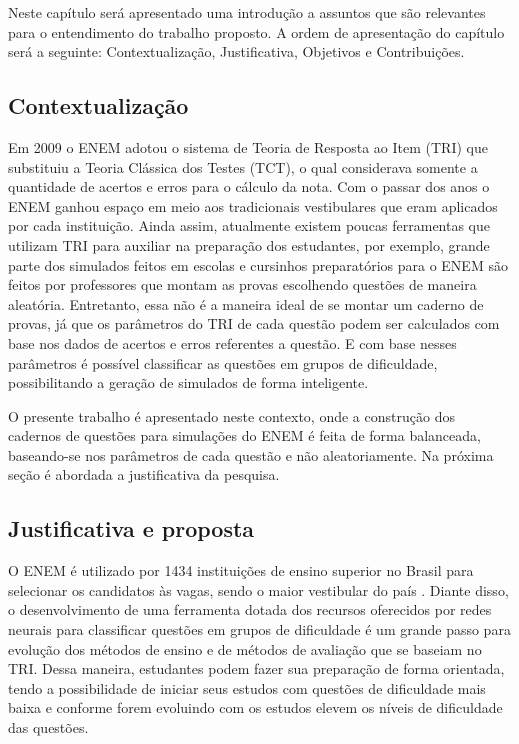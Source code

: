 \documentclass[article,	12pt,	oneside, a4paper,	english, brazil, sumario=tradicional, section=TITLE]{abntex2}
\begin{document}
Neste capítulo será apresentado uma introdução a assuntos que são relevantes para o entendimento do trabalho proposto. A ordem de apresentação do capítulo será a seguinte: Contextualização, Justificativa, Objetivos e Contribuições.

\subsection{Contextualização}

Em 2009 o ENEM adotou o sistema de Teoria de Resposta ao Item (TRI) que substituiu a Teoria Clássica dos Testes (TCT), o qual considerava somente a quantidade de acertos e erros para o cálculo da nota. Com o passar dos anos o ENEM ganhou espaço em meio aos tradicionais vestibulares que eram aplicados por cada instituição. Ainda assim, atualmente existem poucas ferramentas que utilizam TRI para auxiliar na preparação dos estudantes, por exemplo, grande parte dos simulados feitos em escolas e cursinhos preparatórios para o ENEM são feitos por professores que montam as provas escolhendo questões de maneira aleatória. Entretanto, essa não é a maneira ideal de se montar um caderno de provas, já que os parâmetros do TRI de cada questão podem ser calculados com base nos dados de acertos e erros referentes a questão. E com base nesses parâmetros é possível classificar as questões em grupos de dificuldade, possibilitando a geração de simulados de forma inteligente.

O presente trabalho é apresentado neste contexto, onde a construção dos cadernos de questões para simulações do ENEM é feita de forma balanceada, baseando-se nos parâmetros de cada questão e não aleatoriamente. Na próxima seção é abordada a justificativa da pesquisa.

\subsection{Justificativa e proposta}
O ENEM é utilizado por 1434 instituições de ensino superior no Brasil para selecionar os candidatos às vagas, sendo o maior vestibular do país \cite{guiaEstudante}. Diante disso, o desenvolvimento de uma ferramenta dotada dos recursos oferecidos por redes neurais para classificar questões em grupos de dificuldade é um grande passo para evolução dos métodos de ensino e de métodos de avaliação que se baseiam no TRI. Dessa maneira, estudantes podem fazer sua preparação de forma orientada, tendo a possibilidade de iniciar seus estudos com questões de dificuldade mais baixa e conforme forem evoluindo com os estudos elevem os níveis de dificuldade das questões.
\end{document}
